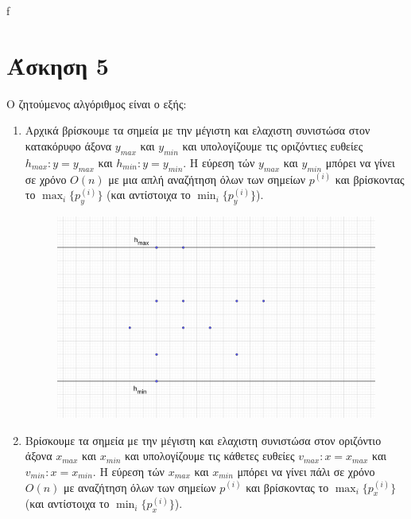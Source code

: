 f\documentclass[12pt]{article}
\begin{document}
\section*{Άσκηση 5}
O ζητούμενος αλγόριθμος είναι ο εξής:
\begin{enumerate}
    \item Αρχικά βρίσκουμε τα σημεία με την μέγιστη και ελαχιστη συνιστώσα στον κατακόρυφο άξονα $y_{max}$ και $y_{min}$ και υπολογίζουμε τις οριζόντιες ευθείες $h_{max}: y=y_{max}$ και $h_{min}: y=y_{min}$. H εύρεση τών $y_{max}$ και $y_{min}$
            μπόρει να γίνει σε χρόνο $O(n)$ με μια απλή αναζήτηση όλων των σημείων $p^{(i)}$ και βρίσκοντας το $\max_i\{p^{(i)}_y\}$ (και αντίστοιχα το $\min_i\{p^{(i)}_y\}$).
            \begin{figure}[H]

                \centering
                \includegraphics[scale = 0.8]{geogebra-export5.png}
            \end{figure}
    \item  Βρίσκουμε τα σημεία με την μέγιστη και ελαχιστη συνιστώσα στον οριζόντιο άξονα $x_{max}$ και $x_{min}$ και υπολογίζουμε τις κάθετες ευθείες $v_{max}: x=x_{max}$ και $v_{min}: x=x_{min}$. H εύρεση τών $x_{max}$ και $x_{min}$
    μπόρει να γίνει πάλι σε χρόνο $O(n)$ με αναζήτηση όλων των σημείων $p^{(i)}$ και βρίσκοντας το $\max_i\{p^{(i)}_x\}$ (και αντίστοιχα το $\min_i\{p^{(i)}_x\}$).
    \begin{figure}[H]


\end{figure}
\end{enumerate}
\end{document}
